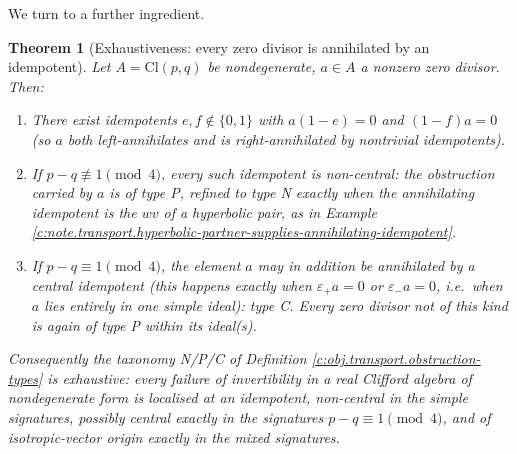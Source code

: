 \documentclass[11pt]{article}
\newtheorem{theorem}{Theorem}[section]
\theoremstyle{definition}
\theoremstyle{plain}
\providecommand{\Cl}{}\renewcommand{\Cl}{\mathrm{Cl}}
\begin{document}
We turn to a further ingredient.

\begin{theorem}[Exhaustiveness: every zero divisor is annihilated by an idempotent]\label{c:transport.exhaustiveness-every-zero-divisor-annihilated-idempotent}
Let $A = \Cl(p,q)$ be nondegenerate, $a \in A$ a nonzero zero divisor. Then:
\begin{enumerate}
\item There exist idempotents $e, f \notin \{0, 1\}$ with $a(1-e) = 0$ and $(1-f)a = 0$ (so $a$ both left-annihilates and is right-annihilated by nontrivial idempotents).
\item If $p - q \not\equiv 1 \pmod 4$, every such idempotent is non-central: the obstruction carried by $a$ is of type P, refined to type N exactly when the annihilating idempotent is the $wv$ of a hyperbolic pair, as in Example \ref{c:note.transport.hyperbolic-partner-supplies-annihilating-idempotent}.
\item If $p - q \equiv 1 \pmod 4$, the element $a$ may in addition be annihilated by a \emph{central} idempotent (this happens exactly when $\varepsilon_+ a = 0$ or $\varepsilon_- a = 0$, i.e.\ when $a$ lies entirely in one simple ideal): type C. Every zero divisor not of this kind is again of type P within its ideal(s).
\end{enumerate}
Consequently the taxonomy N/P/C of Definition \ref{c:obj.transport.obstruction-types} is exhaustive: every failure of invertibility in a real Clifford algebra of nondegenerate form is localised at an idempotent, non-central in the simple signatures, possibly central exactly in the signatures $p - q \equiv 1 \pmod 4$, and of isotropic-vector origin exactly in the mixed signatures.
\end{theorem}
\end{document}
